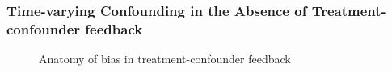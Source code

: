 \documentclass[
  single column]{article}
\begin{document}
\newpage{}

\subsubsection{Time-varying Confounding in the Absence of
Treatment-confounder
feedback}\label{time-varying-confounding-in-the-absence-of-treatment-confounder-feedback}

\begin{figure}

\centering{

\feedbackB

}

\caption{\label{fig-timevarying-nofeedback}Anatomy of bias in
treatment-confounder feedback}

\end{figure}%

\newpage{}
\end{document}
